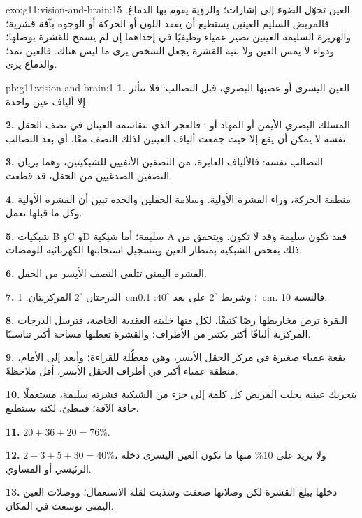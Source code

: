 \begin{solution}{exo:g11:vision-and-brain:15}
العين تحوّل الضوء إلى إشارات؛ والرؤية يقوم بها الدماغ. فالمريض السليم
العينين يستطيع أن يفقد اللون أو الحركة أو الوجوه بآفة قشرية؛ والهريرة
السليمة العينين تصير عمياء وظيفيًا في إحداهما إن لم يسمح للقشرة
بوصلها؛ ودواء لا يمس العين ولا بنية القشرة يجعل الشخص يرى ما ليس
هناك. فالعين تمد؛ والدماغ يرى.
\end{solution}

\begin{solution}{pb:g11:vision-and-brain:1}
\textbf{1.} العين اليسرى أو عصبها البصري، قبل التصالب: فلا تتأثر إلا
ألياف عين واحدة.

\textbf{2.} المسلك البصري الأيمن أو المهاد أو : فالعجز
الذي تتقاسمه العينان في نصف الحقل نفسه لا يمكن أن يقع إلا حيث جمعت
ألياف العينين لذلك النصف معًا، أي بعد التصالب.

\textbf{3.} التصالب نفسه: فالألياف العابرة، من النصفين الأنفيين
للشبكيتين، وهما يريان النصفين الصدغيين من الحقل، قد قطعت.

\textbf{4.} منطقة الحركة، وراء القشرة الأولية. وسلامة الحقلين والحدة
تبين أن القشرة الأولية وكل ما قبلها تعمل.

\textbf{5.} شبكيات B وC وD سليمة؛ أما شبكية A فقد تكون سليمة وقد لا
تكون. ويتحقق من ذلك بفحص الشبكية بمنظار العين وبتسجيل استجابتها
الكهربائية للومضات.

\textbf{6.} القشرة اليمنى تتلقى النصف الأيسر من الحقل.

\textbf{7.} الدرجتان $2^\circ$ المركزيتان: \qty{1}{cm}؛ وشريط
$2^\circ$ على بعد $40^\circ$: \qty{0.1}{cm}. فالنسبة 10.

\textbf{8.} النقرة ترص مخاريطها رصًا كثيفًا، لكل منها خليته العقدية
الخاصة، فترسل الدرجات المركزية أليافًا أكثر بكثير من الأطراف؛ والقشرة
تعطيها مساحة أكبر تناسبيًا.

\textbf{9.} بقعة عمياء صغيرة في مركز الحقل الأيسر، وهي معطِّلة
للقراءة؛ وأبعد إلى الأمام، منطقة عمياء أكبر في أطراف الحقل الأيسر،
أقل ملاحظةً.

\textbf{10.} بتحريك عينيه يجلب المريض كل كلمة إلى جزء من الشبكية
قشرته سليمة، مستعملًا حافة الآفة؛ فيبطئ، لكنه يستطيع.

\textbf{11.} $20 + 36 + 20 = 76\%$.

\textbf{12.} $2 + 3 + 5 + 30 = 40\%$، ولا يزيد على 10\% منها ما تكون
العين اليسرى دخله الرئيسي أو المساوي.

\textbf{13.} دخلها يبلغ القشرة لكن وصلاتها ضعفت وشذبت لقلة الاستعمال؛
ووصلات العين اليمنى توسعت في المكان.


\end{solution}
